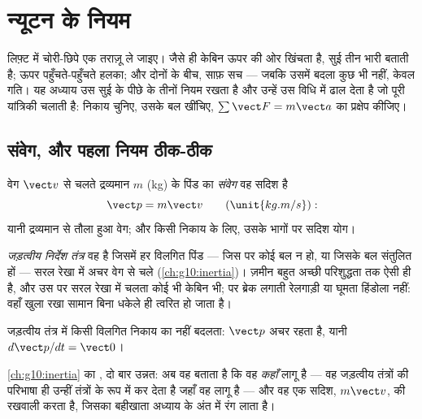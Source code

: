 \chapter{न्यूटन के नियम}\label{ch:g12:newtons-laws}

लिफ़्ट में चोरी-छिपे एक तराज़ू ले जाइए। जैसे ही केबिन ऊपर की ओर खिंचता है, सुई
तीन  भारी बताती है; ऊपर पहुँचते-पहुँचते हलका; और दोनों के बीच,
साफ़ सच --- जबकि उसमें बदला कुछ भी नहीं, केवल गति। यह अध्याय उस सुई के पीछे के
तीनों नियम रखता है और उन्हें उस विधि में ढाल देता है जो पूरी यांत्रिकी चलाती
है: निकाय चुनिए, उसके बल खींचिए, $\sum \vect F = m\vect a$ का प्रक्षेप कीजिए।

\section{संवेग, और पहला नियम ठीक-ठीक}

\begin{definition}[संवेग]\label{def:g12:newtons-laws:momentum}
वेग $\vect v$ से चलते द्रव्यमान $m$ (\unit{kg}) के पिंड का
\emph{संवेग} वह सदिश है
\[
\vect p = m \vect v \qquad (\unit{kg.m/s}):
\]
यानी द्रव्यमान से तौला हुआ वेग; और किसी निकाय के लिए, उसके भागों पर सदिश योग।
\end{definition}

\begin{definition}[जड़त्वीय निर्देश तंत्र]\label{def:g12:newtons-laws:inertial}
\emph{जड़त्वीय निर्देश तंत्र} वह है जिसमें हर
विलगित पिंड --- जिस पर कोई बल न हो, या जिसके बल संतुलित
हों --- सरल रेखा में अचर वेग से चले (\cref{ch:g10:inertia})। ज़मीन बहुत अच्छी परिशुद्धता तक
ऐसी ही है, और उस पर सरल रेखा में  चलता कोई भी केबिन भी; पर ब्रेक लगाती
रेलगाड़ी या घूमता हिंडोला नहीं: वहाँ खुला रखा सामान बिना धकेले ही त्वरित हो
जाता है।
\end{definition}

\begin{theorem}[न्यूटन का पहला नियम]\label{thm:g12:newtons-laws:first}
जड़त्वीय तंत्र में किसी विलगित निकाय का  नहीं बदलता: $\vect p$ अचर
रहता है, यानी $d\vect p/dt = \vect 0$।
\end{theorem}
\admitted

\begin{remark}[जड़त्व, दो बार धार दिया हुआ]\label{rem:g12:newtons-laws:sharpened}
\cref{ch:g10:inertia} का , दो बार उन्नत: अब वह बताता है कि वह \emph{कहाँ}
लागू है --- वह जड़त्वीय तंत्रों की परिभाषा ही उन्हीं तंत्रों के रूप में कर देता
है जहाँ वह लागू है --- और वह एक सदिश, $m\vect v$, की रखवाली करता है, जिसका बहीखाता
अध्याय के अंत में रंग लाता है।
\end{remark}

